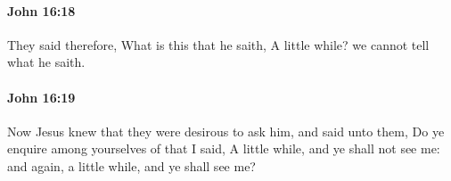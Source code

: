 		\paragraph{John 16:18} %
			\label{JOHN-16-18}

			They said therefore, What is this that he saith, A little while? we cannot tell what he saith.

			\begin{framed}
				\scriptsize
				\begin{compactdesc}
					\item[SBLG] 
				\end{compactdesc}
			\end{framed}

		\paragraph{John 16:19} %
			\label{JOHN-16-19}

			Now Jesus knew that they were desirous to ask him, and said unto them, Do ye enquire among yourselves of that I said, A little while, and ye shall not see me: and again, a little while, and ye shall see me?

